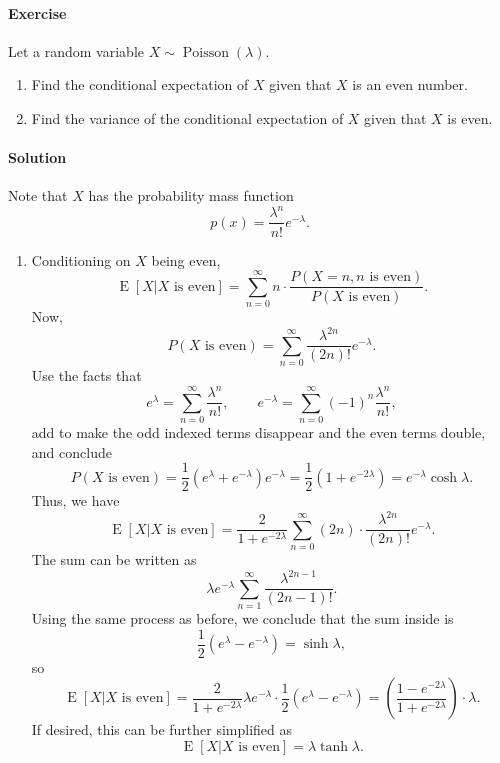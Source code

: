 \documentclass[10pt]{article}
\newcounter{prob}
\def\problem{\stepcounter{prob}\paragraph{Exercise \arabic{prob}}}
\def\solution{\paragraph{Solution}}
\newcommand\op[1]{\operatorname{#1}}
\newcommand\E[1]{\op{E}[#1]}
\begin{document}
        \problem Let a random variable $X \sim \operatorname{Poisson}(\lambda)$.
        \begin{enumerate}
            \itemsep0em
            \item Find the conditional expectation of $X$ given that $X$ is an even
            number.
            \item Find the variance of the conditional expectation of $X$ given that
            $X$ is even.
        \end{enumerate}

        \solution Note that $X$ has the probability mass function \[
            p(x) = \frac{\lambda^n}{n!}e^{-\lambda}.
        \] 
        \begin{enumerate}
            \itemsep0em
            \item Conditioning on $X$ being even, \[
                \E{X|X\text{ is even}} = \sum_{n = 0}^\infty n \cdot \frac{P(X = n,
                n\text{ is even})}{P(X\text{ is even})}.
            \] Now, \[
                P(X\text{ is even}) = \sum_{n = 0}^\infty
                \frac{\lambda^{2n}}{(2n)!}e^{-\lambda}.
            \] Use the facts that \[
                e^{\lambda} = \sum_{n = 0}^\infty \frac{\lambda^n}{n!}, \qquad
                e^{-\lambda} = \sum_{n = 0}^\infty (-1)^n\frac{\lambda^n}{n!},
            \] add to make the odd indexed terms disappear and the even terms
            double, and conclude \[
                P(X\text{ is even}) = \frac{1}{2}(e^{\lambda} +
                e^{-\lambda})e^{-\lambda} = \frac{1}{2}(1 + e^{-2\lambda}) =
               e^{-\lambda} \cosh{\lambda}.
            \] Thus, we have \[
                \E{X|X\text{ is even}} = \frac{2}{1 + e^{-2\lambda}}\sum_{n =
                0}^\infty (2n)\cdot \frac{\lambda^{2n}}{(2n)!}e^{-\lambda}.
            \] The sum can be written as \[
                \lambda e^{-\lambda}\sum_{n = 1}^\infty \frac{\lambda^{2n - 1}}{(2n
                - 1)!}.
            \] Using the same process as before, we conclude that the sum inside is
            \[
                \frac{1}{2}(e^{\lambda} - e^{-\lambda}) = \sinh{\lambda},
            \] so \[
                \E{X|X\text{ is even}} = \frac{2}{1 + e^{-2\lambda}}\lambda
                e^{-\lambda}\cdot \frac{1}{2}(e^{\lambda} - e^{-\lambda}) = \left(\frac{1
                - e^{-2\lambda}}{1 + e^{-2\lambda}}\right)\cdot \lambda.
            \] If desired, this can be further simplified as \[
                \E{X|X\text{ is even}} = \lambda \tanh{\lambda}.
            \] 


\end{enumerate}
\end{document}
